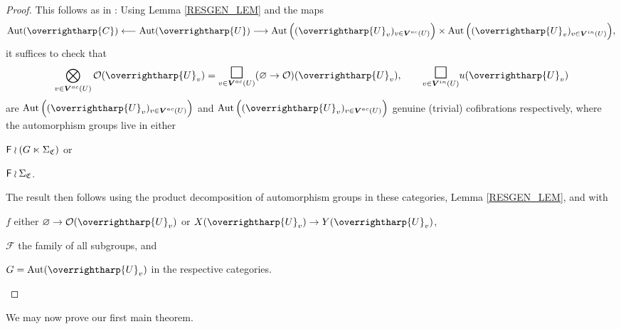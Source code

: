 \documentclass[a4paper,10pt
,draft
]{article}%
\renewcommand{\F}{\mathcal F}
\renewcommand{\1}{\eta}%
\newcommand{\vect}[1]{\text{\overrightharp{\ensuremath{#1}}}}
\begin{document}
\begin{proof}
      This follows as in \cite{BP_geo}:
      Using Lemma \ref{RESGEN_LEM} and the maps
      \[
            \Aut(\vect C) \longleftarrow \Aut(\vect U) \longto
            \Aut\Big((\vect U_v)_{v \in \boldsymbol{V}^{ac}(U)}\Big) \times \Aut\Big((\vect U_v)_{v \in \boldsymbol{V}^{in}(U)}\Big),
      \]
      it suffices to check that
      \[
            \bigotimes_{v \in \boldsymbol{V}^{ac}(U)} \O(\vect U_v) = \underset{v \in \boldsymbol{V}^{ac}(U)}{\mathlarger{\mathlarger{\mathlarger{\square}}}}(\varnothing \to \O)(\vect U_v),
            \qquad
            \underset{v \in \boldsymbol{V}^{in}(U)}{\mathlarger{\mathlarger{\mathlarger{\square}}}} u(\vect U_v)
      \]
      are $\Aut\Big((\vect U_v)_{v \in \boldsymbol{V}^{ac}(U)}\Big)$ and
      $\Aut\Big((\vect U_v)_{v \in \boldsymbol{V}^{ac}(U)}\Big)$ genuine (trivial) cofibrations respectively, 
      where the automorphism groups live in either
      \begin{inparaenum}[(i)]
      \item $\mathsf{F} \wr (G \ltimes \Sigma_{\mathfrak C})$ or
      \item $\mathsf{F} \wr \Sigma_{\mathfrak C}$.
      \end{inparaenum}
      The result then follows using the product decomposition of automorphism groups in these categories,
      Lemma \ref{RESGEN_LEM}, and \cite[Prop. 6.24]{BP_geo} with
      \begin{inparaenum}[(a)]
      \item $f$ either $\varnothing \to \O(\vect U_v)$ or $X(\vect U_v) \to Y(\vect U_v)$,
      \item $\F$ the family of all subgroups, and
      \item $G = \Aut(\vect U_v)$ in the respective categories.
      \end{inparaenum}
\end{proof}



We may now prove our first main theorem.
\end{document}
